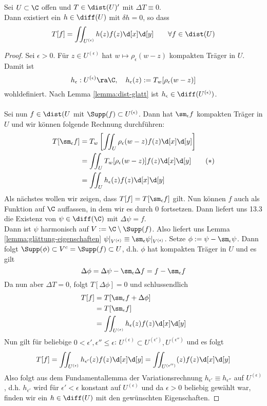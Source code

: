 \begin{thm}
  \label{thm:weyl}
  Sei $U \subset \C$ offen und $T \in \dist(U)'$ mit $\Delta T \equiv
  0$. \\
  Dann existiert ein $h \in \diff(U)$ mit $\delta h = 0$, so dass
  \[T[f] = \iint_{U^{(\epsilon)}} h(z) f(z) \d[x]\d[y] \qquad \forall f \in \dist(U)
  \]
\end{thm}

\begin{proof}
  Sei $\epsilon > 0$. Für $z \in U^{(\epsilon)}$ hat $w \mapsto
  \rho_\epsilon(w - z)$ kompakten Träger in $U$. Damit ist
  \[
  h_\epsilon : U^{(\epsilon)} \ra \C, \quad h_\epsilon(z) :=
  T_w[\rho_\epsilon(w - z)]
  \]
  wohldefiniert. Nach Lemma \ref{lemma:dist-glatt} ist $h_\epsilon \in
  \diff(U^{(\epsilon)})$. \\
  \\
  Sei nun $f \in \dist(U$ mit $\Supp(f) \subset U^{(\epsilon)}$. Dann
  hat $\sm_\epsilon f$ kompakten Träger in $U$ und wir können folgende
  Rechnung durchführen:
  \begin{align*}
    T[\sm_\epsilon f] & = T_w \left [ \iint_U \rho_\epsilon(w - z)
      f(z) \d[x]\d[y] \right ] \\
    & = \iint_U T_w[\rho_\epsilon(w-z)] f(z)
    \d[x]\d[y] \label{eq:weyl} \tag{$\ast$} \\
    & = \iint_U h_\epsilon(z) f(z) \d[x]\d[y]
  \end{align*}
  Als nächstes wollen wir zeigen, dass $T[f] = T[\sm_\epsilon f]$
  gilt. Nun können $f$ auch als Funktion auf $\C$ auffassen, in dem
  wir es durch 0 fortsetzen. Dann liefert uns 13.3 die Existenz von
  $\psi \in \diff(\C)$ mit $\Delta \psi = f$. \\
  Dann ist $\psi$ harmonisch auf $V:= \C \setminus \Supp(f)$. Also
  liefert uns Lemma \ref{lemma:glättung-eigenschaften} $\psi|_{V^{(\epsilon)}}
  \equiv \sm_\epsilon \psi|_{V^{(\epsilon)}}$. Setze $\phi := \psi -
  \sm_\epsilon\psi$. Dann folgt $\Supp(\phi) \subset V^c = \Supp(f)
  \subset U$, d.h. $\phi$ hat kompakten Träger in $U$ und es gilt
  \[
  \Delta \phi = \Delta \psi - \sm_\epsilon \Delta f = f - \sm_\epsilon
  f
  \]
  Da nun aber $\Delta T = 0$, folgt $T[\Delta \phi] = 0$ und
  schlussendlich
  \begin{align*}
    T[f] & = T[\sm_\epsilon f + \Delta \phi] \\
    & = T[\sm_\epsilon f] \\
    & = \iint_{U^{(\epsilon)}} h_\epsilon(z) f(z) \d[x]\d[y]
  \end{align*}
  Nun gilt für beliebige $0 < \epsilon', \epsilon'' \leq \epsilon$:
  $U^{(\epsilon)} \subset U^{(\epsilon')}, U^{(\epsilon'')}$ und es
  folgt
  \[
  T[f] = \iint_{U^{(\epsilon)}}h_{\epsilon'}(z) f(z) \d[x]\d[y] =
  \iint_{U^{(\epsilon'')}}(z) f(z) \d[x] \d[y]
  \]
  Also folgt aus dem Fundamentallemma der Variationsrechnung
  $h_{\epsilon'} \equiv h_{\epsilon''}$ auf $U^{(\epsilon)}$,
  d.h. $h_{\epsilon'}$ wird für $\epsilon' < \epsilon$ konstant auf
  $U^{(\epsilon)}$ und da $\epsilon > 0$ beliebig gewählt war, finden
  wir ein $h \in \diff(U)$ mit den gewünschten Eigenschaften.
\end{proof}

